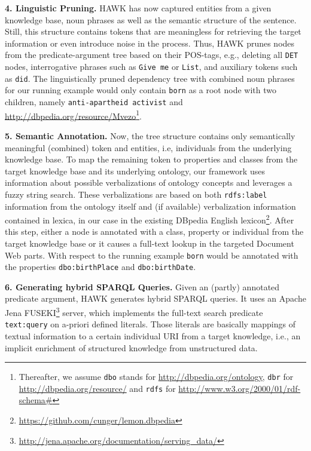 \documentclass{llncs}
\begin{document}
\textbf{4. Linguistic Pruning.}
HAWK has now captured entities from a given knowledge base, noun phrases as well as the semantic structure of the sentence. 
Still, this structure contains tokens that are meaningless for retrieving the target information or even introduce noise in the process.
Thus, HAWK prunes nodes from the predicate-argument tree based on their POS-tags, e.g., deleting all \texttt{DET} nodes, interrogative phrases such as \texttt{Give me} or \texttt{List}, and auxiliary tokens such as \texttt{did}.
The linguistically pruned dependency tree with combined noun phrases for our running example would only contain \texttt{born} as a root node with two children, namely \texttt{anti-apartheid activist} and \url{http://dbpedia.org/resource/Mvezo}\footnote{Thereafter, we assume \texttt{dbo} stands for \url{http://dbpedia.org/ontology}, \texttt{dbr} for \url{http://dbpedia.org/resource/} and \texttt{rdfs} for \url{http://www.w3.org/2000/01/rdf-schema#} }.

\textbf{5. Semantic Annotation.}
Now, the tree structure contains only semantically meaningful (combined) token and entities, i.e, individuals from the underlying knowledge base. 
To map the remaining token to properties and classes from the target knowledge base and its underlying ontology, our framework uses information about possible verbalizations of ontology concepts and leverages a fuzzy string search.
These verbalizations are based on both \texttt{rdfs:label} information from the ontology itself and (if available) verbalization information contained in lexica, in our case in the existing DBpedia English lexicon\footnote{\url{https://github.com/cunger/lemon.dbpedia}}.
After this step, either a node is annotated with a class, property or individual from the target knowledge base or it causes a full-text lookup in the targeted Document Web parts.
With respect to the running example \texttt{born} would be annotated with the properties \texttt{dbo:birthPlace} and \texttt{dbo:birthDate}.

\textbf{6. Generating hybrid SPARQL Queries.}
Given an (partly) annotated predicate argument, HAWK generates hybrid SPARQL queries.
It uses an Apache Jena FUSEKI\footnote{\url{http://jena.apache.org/documentation/serving_data/}} server, which implements the full-text search predicate \texttt{text:query} on a-priori defined literals. 
Those literals are basically mappings of textual information to a certain individual URI from a target knowledge, i.e., an implicit enrichment of structured knowledge from unstructured data. 
\end{document}
